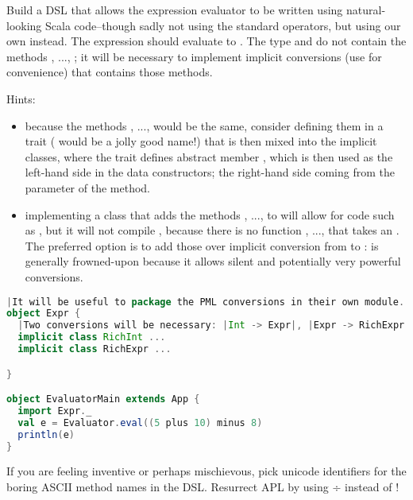 \documentclass[10 pt]{article}
\begin{document}
\begin{example}
Build a DSL that allows the expression evaluator to be written using natural-looking Scala code--though sadly not using the standard \pcode{+, -, *, /} operators, but using our own  instead. The expression  should evaluate to . The type  and  do not contain the methods , ..., ; it will be necessary to implement implicit conversions (use  for convenience) that contains those methods. 

Hints: \begin{itemize}
  \item because the methods , ...,  would be the same, consider defining them in a trait ( would be a jolly good name!) that is then mixed into the implicit classes, where the trait defines abstract member , which is then used as the left-hand side in the  data constructors; the right-hand side coming from the parameter of the method.
  \item implementing a class that adds the methods , ...,  to  will allow for code such as , but it will not compile , because there is no function , ...,  that takes an . The preferred option is to add those over implicit conversion from  to :  is generally frowned-upon because it allows silent and potentially very powerful conversions.
\end{itemize}

\begin{lstlisting}[caption={Expression evaluator}, label={code:eepm}, language=Scala, escapechar=|]
|It will be useful to package the PML conversions in their own module.|
object Expr {
  |Two conversions will be necessary: |Int -> Expr|, |Expr -> RichExpr|.|
  implicit class RichInt ...
  implicit class RichExpr ...

}

object EvaluatorMain extends App {
  import Expr._
  val e = Evaluator.eval((5 plus 10) minus 8)
  println(e)
}
\end{lstlisting}

If you are feeling inventive or perhaps mischievous, pick unicode identifiers for the boring ASCII method names in the DSL. Resurrect APL by using ÷ instead of !
\end{example}
\end{document}
